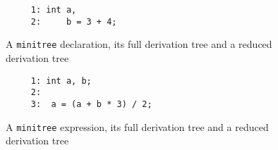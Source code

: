 \begin{figure}
\hspace*{4cm}
\begin{minipage}{10cm}
\begin{verbatim}
     1: int a, 
     2:     b = 3 + 4;
\end{verbatim}
\end{minipage}

\vspace*{1cm}

\hspace*{4cm}
\begin{minipage}{10cm}
\end{minipage}

\vspace*{1cm}

\hspace*{5cm}
\begin{minipage}{10cm}
\end{minipage}

\caption{A {\tt minitree} declaration, its full derivation tree and a reduced derivation tree}
\label{tree:dec}
\end{figure}

\begin{figure}
\hspace*{2cm}
\begin{minipage}{10cm}
\begin{verbatim}
     1: int a, b;
     2:  
     3:  a = (a + b * 3) / 2;
\end{verbatim}
\end{minipage}

\vspace*{1cm}

\hspace*{3cm}
\begin{minipage}{10cm}
\end{minipage}

\vspace*{1cm}

\hspace*{5cm}
\begin{minipage}{10cm}
\end{minipage}

\caption{A {\tt minitree} expression, its full derivation tree and a reduced derivation tree}
\label{tree:exp}
\end{figure}

